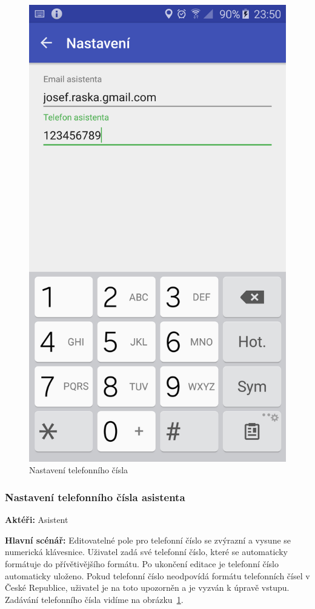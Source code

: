 \documentclass{article}
\newcommand{\usecase}[2]{\subsubsection{#1}\label{#2}}
\begin{document}
\begin{figure}[H]
\begin{minipage}{.5\textwidth}
                \includegraphics[scale=0.14]{img/screen/nastaveniasistent.png}
        \caption{Nastavení telefonního čísla}
        \label{fig:nastavenicisla}
    \end{minipage}
\end{figure}

\usecase{Nastavení telefonního čísla asistenta}{nastavenicisla}
\textbf{Aktéři:} Asistent

\vspace{0.1cm}
\noindent
\textbf{Hlavní scénář:} Editovatelné pole pro telefonní číslo se zvýrazní a vysune se numerická klávesnice.
Uživatel zadá své telefonní číslo, které se automaticky formátuje do přívětivějšího formátu. Po ukončení
editace je telefonní číslo automaticky uloženo. Pokud telefonní číslo neodpovídá formátu telefonních čísel
v České Republice, uživatel je na toto upozorněn a je vyzván k úpravě vstupu. Zadávání telefonního čísla
vidíme na obrázku~\ref{fig:nastavenicisla}.
\end{document}
